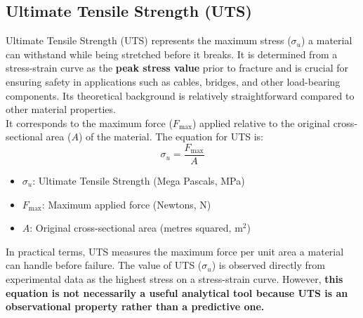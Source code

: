 \documentclass{article}
\begin{document}
\subsection{Ultimate Tensile Strength (UTS)}
Ultimate Tensile Strength (UTS) represents the maximum stress ($\sigma_{u}$) a material can withstand while being stretched before it breaks. It is determined from a stress-strain curve as the \textbf{peak stress value} prior to fracture and is crucial for ensuring safety in applications such as cables, bridges, and other load-bearing components. Its theoretical background is relatively straightforward compared to other material properties.\\[8pt]
It corresponds to the maximum force ($F_{\text{max}}$) applied relative to the original cross-sectional area ($A$) of the material. The equation for UTS is:
\begin{equation}
    \sigma_{u} = \frac{F_{\text{max}}}{A}
\end{equation}
\begin{itemize}[itemsep=-1mm]
    \item $\sigma_{u}$: Ultimate Tensile Strength (Mega Pascals, MPa)
    \item $F_{\text{max}}$: Maximum applied force (Newtons, N)
    \item $A$: Original cross-sectional area (metres squared, $\text{m}^2$)
\end{itemize}
In practical terms, UTS measures the maximum force per unit area a material can handle before failure. The value of UTS ($\sigma_{u}$) is observed directly from experimental data as the highest stress on a stress-strain curve. However, \textbf{this equation is not necessarily a useful analytical tool because UTS is an observational property rather than a predictive one.}
\end{document}
